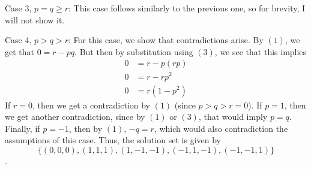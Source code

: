 \documentclass[12pt]{article}
\begin{document}
Case 3, $p = q \geq r$: This case follows similarly to the previous one, so for brevity, I will not show it. 

Case 4, $p > q > r$: For this case, we show that contradictions arise. By $(1)$, we get that $0 = r - pq$. But then by substitution using $(3)$, we see that this implies 
\begin{align*}
    0 &= r - p(rp) \\
    0 &= r - rp^2 \\
    0 &= r(1 - p^2)
\end{align*}
If $r = 0$, then we get a contradiction by $(1)$ (since $p > q > r = 0$). If $p = 1$, then we get another contradiction, since by $(1)$ or $(3)$, that would imply $p = q$. Finally, if $p = -1$, then by $(1)$, $-q = r$, which would also contradiction the assumptions of this case. Thus, the solution set is given by 
$$\{(0,0,0), (1,1,1), (1,-1,-1), (-1,1,-1), (-1,-1,1)\}$$.
\end{document}
